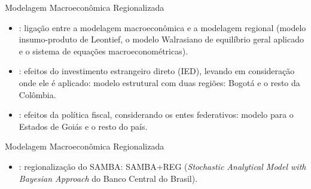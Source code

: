 \documentclass[presentation.tex]{subfiles}
\begin{document}

\begin{frame}[fragile]{Modelagem Macroeconômica Regionalizada}

\begin{itemize}

	\item \textcite{rickman_modern_2010}: ligação entre a modelagem macroeconômica e a modelagem regional (modelo insumo-produto de
	Leontief, o modelo Walrasiano de equilíbrio geral aplicado e o sistema de equações macroeconométricas).

	\item \textcite{mora_fdi_2019}: efeitos do investimento estrangeiro direto (IED), levando em consideração onde ele é aplicado: modelo estrutural com duas regiões: Bogotá e o resto da Colômbia.

	\item \textcite{costa_junior_dsge_2022}: efeitos da política fiscal, considerando os entes federativos: modelo para o Estados de Goiás e o resto do país.
	
\end{itemize}
		
\end{frame}


\begin{frame}{Modelagem Macroeconômica Regionalizada}
	
	\begin{itemize}
		
		\item \textcite{osterno_uma_2022}: regionalização do SAMBA: SAMBA+REG (\textit{Stochastic Analytical Model with Bayesian Approach} do Banco Central do Brasil).
				
	\end{itemize}
	
\end{frame}
\end{document}
